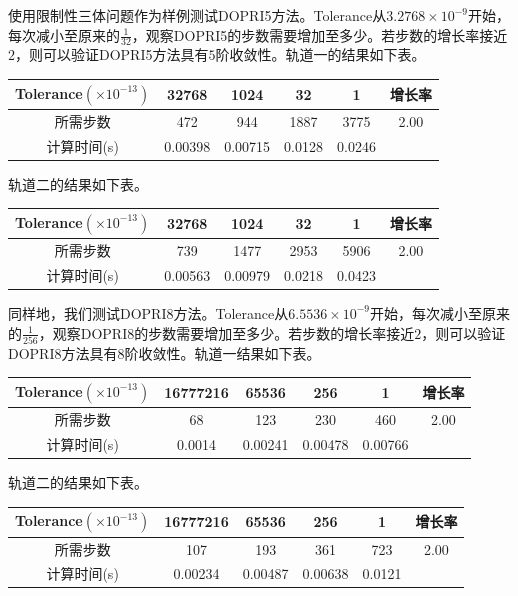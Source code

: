 \documentclass[lang=cn,10pt,bibend=bibtex]{elegantbook}
\begin{document}
使用限制性三体问题作为样例测试DOPRI5方法。Tolerance从$3.2768\times 10^{-9}$开始，每次减小至原来的$\frac{1}{32}$，观察DOPRI5的步数需要增加至多少。若步数的增长率接近$2$，则可以验证DOPRI5方法具有$5$阶收敛性。轨道一的结果如下表。

\begin{table}[H]
  \centering
  \begin{tabular}{c|cccc|c}
    Tolerance$(\times 10^{-13})$ & 32768 & 1024 & 32 & 1 & 增长率 \\ \hline
    所需步数 & 472 & 944 & 1887 & 3775 & 2.00   \\
    计算时间(s) & 0.00398 & 0.00715  & 0.0128  & 0.0246 & 
  \end{tabular}
\end{table}

轨道二的结果如下表。

\begin{table}[H]
  \centering
  \begin{tabular}{c|cccc|c}
    Tolerance$(\times 10^{-13})$ & 32768 & 1024 & 32 & 1 & 增长率 \\ \hline
    所需步数 & 739 & 1477 & 2953 & 5906 & 2.00   \\
    计算时间(s) & 0.00563 & 0.00979  & 0.0218  & 0.0423 & 
  \end{tabular}
\end{table}

同样地，我们测试DOPRI8方法。Tolerance从$6.5536\times 10^{-9}$开始，每次减小至原来的$\frac{1}{256}$，观察DOPRI8的步数需要增加至多少。若步数的增长率接近$2$，则可以验证DOPRI8方法具有$8$阶收敛性。轨道一结果如下表。

\begin{table}[H]
  \centering
  \begin{tabular}{c|cccc|c}
    Tolerance$(\times 10^{-13})$ & 16777216 & 65536 & 256 & 1 & 增长率 \\ \hline
    所需步数 & 68 & 123 & 230  & 460 & 2.00   \\
    计算时间(s) & 0.0014 & 0.00241  & 0.00478  & 0.00766 & 
  \end{tabular}
\end{table}

轨道二的结果如下表。

\begin{table}[H]
  \centering
  \begin{tabular}{c|cccc|c}
    Tolerance$(\times 10^{-13})$ & 16777216 & 65536 & 256 & 1 & 增长率 \\ \hline
    所需步数 & 107 & 193 & 361 & 723 & 2.00   \\
    计算时间(s) & 0.00234 & 0.00487  & 0.00638  & 0.0121 & 
  \end{tabular}
\end{table}
\end{document}
